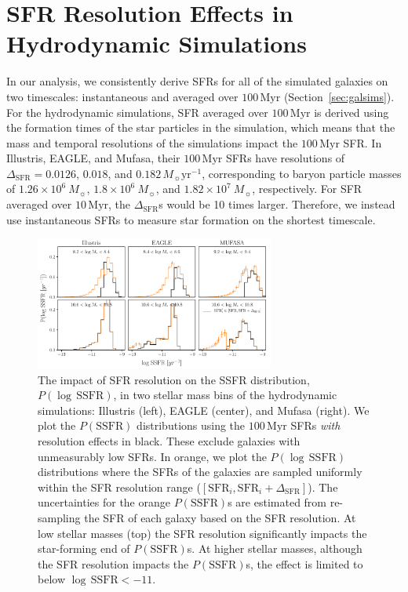 \documentclass[tighten, preprint]{aastex62}
\begin{document}
\section{SFR Resolution Effects in Hydrodynamic Simulations} \label{app:zerosfr}
In our analysis, we consistently derive SFRs for all of the simulated
galaxies on two timescales: instantaneous and averaged over 
$100\,\mathrm{Myr}$ (Section~\ref{sec:galsims}). For the hydrodynamic 
simulations, SFR averaged over $100\,\mathrm{Myr}$ is derived using 
the formation times of the star particles in the simulation, which 
means that the mass and temporal resolutions of the simulations 
impact the $100\,\mathrm{Myr}$ SFR. In Illustris, EAGLE, and {\sc Mufasa},
their $100\,\mathrm{Myr}$ SFRs have resolutions of 
$\Delta_\mathrm{SFR} = 0.0126$, $0.018$, and $0.182\,M_\sun \mathrm{yr}^{-1}$, 
corresponding to baryon particle masses of $1.26 \times 10^6\ M_{\sun}$, 
$1.8 \times 10^6\ M_{\sun}$, and $1.82 \times 10^7\ M_{\sun}$, respectively. 
For SFR averaged over $10\,\mathrm{Myr}$, the $\Delta_\mathrm{SFR}$s would be 
10 times larger. Therefore, we instead use instantaneous SFRs to measure 
star formation on the shortest timescale.

\begin{figure}
\begin{center}
\includegraphics[width=0.7\textwidth]{Pssfr_res_impact.pdf} 
\caption{The impact of SFR resolution on the SSFR distribution, 
$P(\log\,\mathrm{SSFR})$, in two stellar mass bins of the hydrodynamic 
simulations:
Illustris (left), EAGLE (center), and {\sc Mufasa} (right). We plot the 
$P(\mathrm{SSFR})$ distributions using the $100\,\mathrm{Myr}$
SFRs \emph{with} resolution effects in black. These exclude galaxies with 
unmeasurably low SFRs. In orange, we plot the $P(\log\,\mathrm{SSFR})$ 
distributions where the SFRs of the galaxies
are sampled uniformly within the SFR resolution range 
($[\mathrm{SFR}_i, \mathrm{SFR}_i+\Delta_\mathrm{SFR}]$). The 
uncertainties for the orange $P(\mathrm{SSFR})$s are estimated from 
re-sampling the SFR of each galaxy based on the SFR resolution. 
At low stellar masses (top) the SFR resolution significantly impacts 
the star-forming end of $P(\mathrm{SSFR})$s. At higher stellar masses, 
although the SFR resolution impacts the $P(\mathrm{SSFR})$s, the effect 
is limited to below $\log\,\mathrm{SSFR} < -11$.
} 
\label{fig:sfrres_pssfr}
\end{center}
\end{figure}
\end{document}
